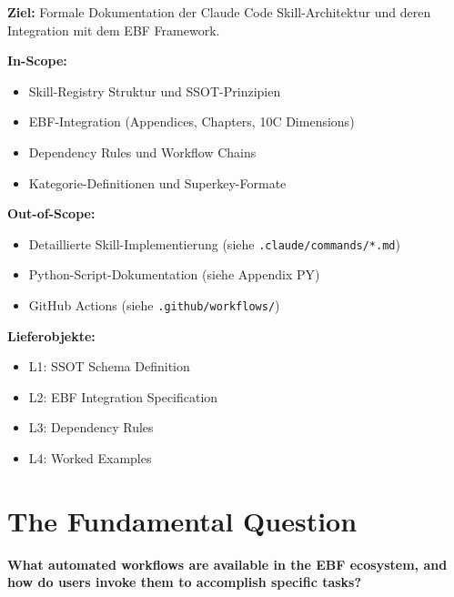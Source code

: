 \begin{tcolorbox}[colback=green!5!white, colframe=green!75!black,
    title=Appendix Scope]

\textbf{Ziel:} Formale Dokumentation der Claude Code Skill-Architektur und deren Integration mit dem EBF Framework.

\textbf{In-Scope:}
\begin{itemize}[nosep]
\item Skill-Registry Struktur und SSOT-Prinzipien
\item EBF-Integration (Appendices, Chapters, 10C Dimensions)
\item Dependency Rules und Workflow Chains
\item Kategorie-Definitionen und Superkey-Formate
\end{itemize}

\textbf{Out-of-Scope:}
\begin{itemize}[nosep]
\item Detaillierte Skill-Implementierung (siehe \texttt{.claude/commands/*.md})
\item Python-Script-Dokumentation (siehe Appendix PY)
\item GitHub Actions (siehe \texttt{.github/workflows/})
\end{itemize}

\textbf{Lieferobjekte:}
\begin{itemize}[nosep]
\item L1: SSOT Schema Definition
\item L2: EBF Integration Specification
\item L3: Dependency Rules
\item L4: Worked Examples
\end{itemize}

\end{tcolorbox}


\section{The Fundamental Question}
\label{sec:skills-fundamental}

\begin{tcolorbox}[colback=red!5!white, colframe=red!75!black,
    title=The Fundamental Question]
\textbf{What automated workflows are available in the EBF ecosystem, and how
do users invoke them to accomplish specific tasks?}
\end{tcolorbox}

